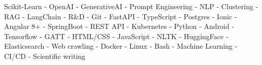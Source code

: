 \small{Scikit-Learn - 
OpenAI - 
GenerativeAI - 
Prompt Engineering - 
NLP -
Clustering - 
RAG - 
LangChain - 
R\&D - 
Git - 
FastAPI - 
TypeScript - 
Postgres - 
Ionic - 
Angular 8+ - 
SpringBoot - 
REST API - 
Kubernetes - 
Python - 
Android - 
Tensorflow - 
GATT - 
HTML/CSS - 
JavaScript - 
NLTK - 
HuggingFace - 
Elasticsearch - 
Web crawling - 
Docker -
Linux -
Bash -
Machine Learning -
CI/CD -
Scientific writing}
